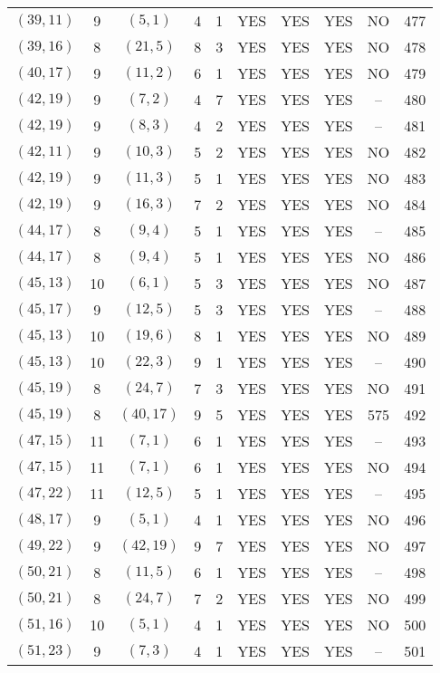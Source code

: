 \begin{longtable}{|c|c|c|c|c|c|c|c|c|c|}
$(39, 11)$ & 9 & $(5, 1)$ & 4 & 1 & YES & YES & YES & NO & 477\\
$(39, 16)$ & 8 & $(21, 5)$ & 8 & 3 & YES & YES & YES & NO & 478\\
$(40, 17)$ & 9 & $(11, 2)$ & 6 & 1 & YES & YES & YES & NO & 479\\
$(42, 19)$ & 9 & $(7, 2)$ & 4 & 7 & YES & YES & YES & -- & 480\\
$(42, 19)$ & 9 & $(8, 3)$ & 4 & 2 & YES & YES & YES & -- & 481\\
$(42, 11)$ & 9 & $(10, 3)$ & 5 & 2 & YES & YES & YES & NO & 482\\
$(42, 19)$ & 9 & $(11, 3)$ & 5 & 1 & YES & YES & YES & NO & 483\\
$(42, 19)$ & 9 & $(16, 3)$ & 7 & 2 & YES & YES & YES & NO & 484\\
$(44, 17)$ & 8 & $(9, 4)$ & 5 & 1 & YES & YES & YES & -- & 485\\
$(44, 17)$ & 8 & $(9, 4)$ & 5 & 1 & YES & YES & YES & NO & 486\\
$(45, 13)$ & 10 & $(6, 1)$ & 5 & 3 & YES & YES & YES & NO & 487\\
$(45, 17)$ & 9 & $(12, 5)$ & 5 & 3 & YES & YES & YES & -- & 488\\
$(45, 13)$ & 10 & $(19, 6)$ & 8 & 1 & YES & YES & YES & NO & 489\\
$(45, 13)$ & 10 & $(22, 3)$ & 9 & 1 & YES & YES & YES & -- & 490\\
$(45, 19)$ & 8 & $(24, 7)$ & 7 & 3 & YES & YES & YES & NO & 491\\
$(45, 19)$ & 8 & $(40, 17)$ & 9 & 5 & YES & YES & YES & 575 & 492\\
$(47, 15)$ & 11 & $(7, 1)$ & 6 & 1 & YES & YES & YES & -- & 493\\
$(47, 15)$ & 11 & $(7, 1)$ & 6 & 1 & YES & YES & YES & NO & 494\\
$(47, 22)$ & 11 & $(12, 5)$ & 5 & 1 & YES & YES & YES & -- & 495\\
$(48, 17)$ & 9 & $(5, 1)$ & 4 & 1 & YES & YES & YES & NO & 496\\
$(49, 22)$ & 9 & $(42, 19)$ & 9 & 7 & YES & YES & YES & NO & 497\\
$(50, 21)$ & 8 & $(11, 5)$ & 6 & 1 & YES & YES & YES & -- & 498\\
$(50, 21)$ & 8 & $(24, 7)$ & 7 & 2 & YES & YES & YES & NO & 499\\
$(51, 16)$ & 10 & $(5, 1)$ & 4 & 1 & YES & YES & YES & NO & 500\\
$(51, 23)$ & 9 & $(7, 3)$ & 4 & 1 & YES & YES & YES & -- & 501\\

\end{longtable}
